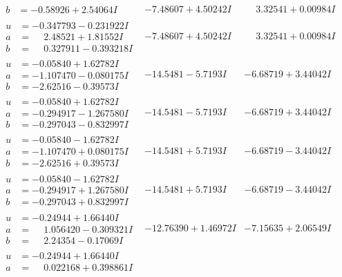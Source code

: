 \documentclass[1p]{elsarticle_modified}
\theoremstyle{definition}
\begin{document}
$$\begin{array}{c|c|c}
\begin{aligned}
b &= -0.58926 + 2.54064 I\end{aligned}
 & -7.48607 + 4.50242 I & \phantom{-}3.32541 + 0.00984 I \\ \hline\begin{aligned}
u &= -0.347793 - 0.231922 I \\
a &= \phantom{-}2.48521 + 1.81552 I \\
b &= \phantom{-}0.327911 - 0.393218 I\end{aligned}
 & -7.48607 + 4.50242 I & \phantom{-}3.32541 + 0.00984 I \\ \hline\begin{aligned}
u &= -0.05840 + 1.62782 I \\
a &= -1.107470 - 0.080175 I \\
b &= -2.62516 - 0.39573 I\end{aligned}
 & -14.5481 - 5.7193 I & -6.68719 + 3.44042 I \\ \hline\begin{aligned}
u &= -0.05840 + 1.62782 I \\
a &= -0.294917 - 1.267580 I \\
b &= -0.297043 - 0.832997 I\end{aligned}
 & -14.5481 - 5.7193 I & -6.68719 + 3.44042 I \\ \hline\begin{aligned}
u &= -0.05840 - 1.62782 I \\
a &= -1.107470 + 0.080175 I \\
b &= -2.62516 + 0.39573 I\end{aligned}
 & -14.5481 + 5.7193 I & -6.68719 - 3.44042 I \\ \hline\begin{aligned}
u &= -0.05840 - 1.62782 I \\
a &= -0.294917 + 1.267580 I \\
b &= -0.297043 + 0.832997 I\end{aligned}
 & -14.5481 + 5.7193 I & -6.68719 - 3.44042 I \\ \hline\begin{aligned}
u &= -0.24944 + 1.66440 I \\
a &= \phantom{-}1.056420 - 0.309321 I \\
b &= \phantom{-}2.24354 - 0.17069 I\end{aligned}
 & -12.76390 + 1.46972 I & -7.15635 + 2.06549 I \\ \hline\begin{aligned}
u &= -0.24944 + 1.66440 I \\
a &= \phantom{-}0.022168 + 0.398861 I \\

\end{aligned}
\end{array}$$
\end{document}
